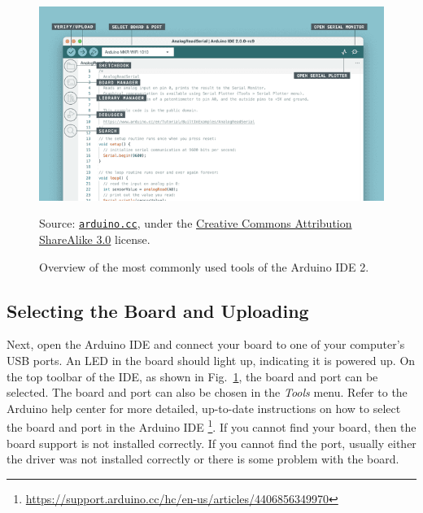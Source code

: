\begin{figure}[b]
  \begin{wide}
    \centering
    \includegraphics[width=\textwidth]{img/ide-2-overview}%
    \\ \scriptsize
    \raggedright
    Source: \href{https://docs.arduino.cc/software/ide-v2/tutorials/getting-started-ide-v2/}{\texttt{arduino.cc}}, under the \href{https://creativecommons.org/licenses/by-sa/3.0/legalcode}{Creative Commons Attribution ShareAlike 3.0} license.
  \caption{Overview of the most commonly used tools of the Arduino IDE 2.
  }
  \label{fig:ide-2-overview}
  \end{wide}
\end{figure}

\subsection{Selecting the Board and Uploading}
Next, open the Arduino IDE and connect your board to one of your computer's USB ports.
An LED in the board should light up, indicating it is powered up.
On the top toolbar of the IDE, as shown in Fig.~\ref{fig:ide-2-overview}, the board and port can be selected.
The board and port can also be chosen in the \emph{Tools} menu.
Refer to the Arduino help center for more detailed, up-to-date instructions on how to select the board and port in the Arduino IDE%
\footnote{\url{https://support.arduino.cc/hc/en-us/articles/4406856349970}}.
If you cannot find your board, then the board support is not installed correctly.
If you cannot find the port, usually either the driver was not installed correctly or there is some problem with the board.

